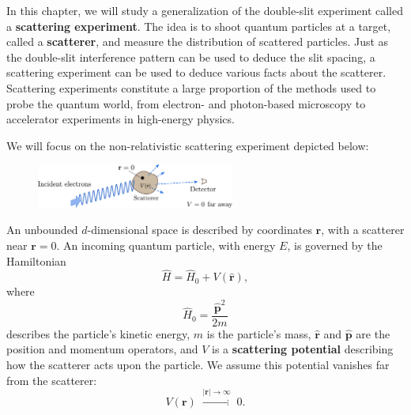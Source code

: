 \documentclass[pra,12pt]{revtex4-2}
\begin{document}
In this chapter, we will study a generalization of the double-slit
experiment called a \textbf{scattering experiment}.  The idea is to
shoot quantum particles at a target, called a \textbf{scatterer}, and
measure the distribution of scattered particles.  Just as the
double-slit interference pattern can be used to deduce the slit
spacing, a scattering experiment can be used to deduce various facts
about the scatterer.  Scattering experiments constitute a large
proportion of the methods used to probe the quantum world, from
electron- and photon-based microscopy to accelerator experiments in
high-energy physics.

We will focus on the non-relativistic scattering experiment depicted
below:

\begin{figure}[h]
  \centering\includegraphics[width=0.58\textwidth]{scattering}
\end{figure}

\noindent
An unbounded $d$-dimensional space is described
by coordinates $\mathbf{r}$, with a scatterer near $\mathbf{r} = 0$.
An incoming quantum particle, with energy $E$, is governed by the
Hamiltonian
\begin{equation}
  \hat{H} = \hat{H}_0 + V(\hat{\mathbf{r}}),
\end{equation}
where
\begin{equation}
  \hat{H}_0 = \frac{\hat{\mathbf{p}}^2}{2m}
\end{equation}
describes the particle's kinetic energy, $m$ is the particle's mass,
$\hat{\mathbf{r}}$ and $\hat{\mathbf{p}}$ are the position and
momentum operators, and $V$ is a \textbf{scattering potential}
describing how the scatterer acts upon the particle.  We assume this
potential vanishes far from the scatterer:
\begin{equation}
  V(\mathbf{r}) \; \overset{|\mathbf{r}| \rightarrow \infty}{\longrightarrow}\; 0.
\end{equation}
\end{document}
